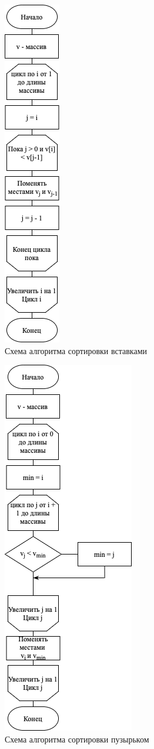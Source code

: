 \documentclass[a4paper,14pt, unknownkeysallowed]{extreport}
\begin{document}
\begin{figure}[h]
	\centering
	\includegraphics[scale=1]{insertion.png}
	\caption{Схема алгоритма сортировки вставками}
	\label{fig:insertion}
\end{figure}

\begin{figure}[h]
	\centering
	\includegraphics[scale=1]{selection.png}
	\caption{Схема алгоритма сортировки пузырьком}
	\label{fig:selection}
\end{figure}
\end{document}
